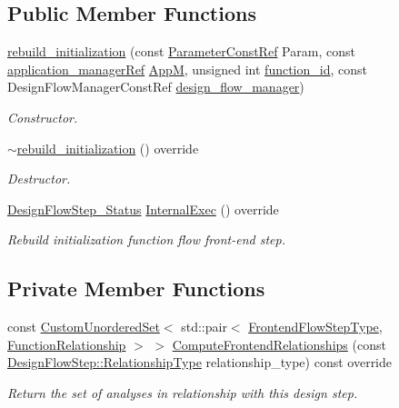 \subsection*{Public Member Functions}
\begin{DoxyCompactItemize}
\item 
\hyperlink{classrebuild__initialization_a3b96231a2b72047550a902503590baec}{rebuild\+\_\+initialization} (const \hyperlink{Parameter_8hpp_a37841774a6fcb479b597fdf8955eb4ea}{Parameter\+Const\+Ref} Param, const \hyperlink{application__manager_8hpp_a04ccad4e5ee401e8934306672082c180}{application\+\_\+manager\+Ref} \hyperlink{classFrontendFlowStep_a0ac0d8db2a378416583f51c4faa59d15}{AppM}, unsigned int \hyperlink{classFunctionFrontendFlowStep_a58ef2383ad1a212a8d3f396625a4b616}{function\+\_\+id}, const Design\+Flow\+Manager\+Const\+Ref \hyperlink{classDesignFlowStep_ab770677ddf087613add30024e16a5554}{design\+\_\+flow\+\_\+manager})
\begin{DoxyCompactList}\small\item\em Constructor. \end{DoxyCompactList}\item 
\hyperlink{classrebuild__initialization_a026135e1c23ed5b77cf93fe574648086}{$\sim$rebuild\+\_\+initialization} () override
\begin{DoxyCompactList}\small\item\em Destructor. \end{DoxyCompactList}\item 
\hyperlink{design__flow__step_8hpp_afb1f0d73069c26076b8d31dbc8ebecdf}{Design\+Flow\+Step\+\_\+\+Status} \hyperlink{classrebuild__initialization_ac95e61c5c62f6c0a5b4ce1557b32ae4f}{Internal\+Exec} () override
\begin{DoxyCompactList}\small\item\em Rebuild initialization function flow front-\/end step. \end{DoxyCompactList}\end{DoxyCompactItemize}
\subsection*{Private Member Functions}
\begin{DoxyCompactItemize}
\item 
const \hyperlink{classCustomUnorderedSet}{Custom\+Unordered\+Set}$<$ std\+::pair$<$ \hyperlink{frontend__flow__step_8hpp_afeb3716c693d2b2e4ed3e6d04c3b63bb}{Frontend\+Flow\+Step\+Type}, \hyperlink{classFrontendFlowStep_af7cf30f2023e5b99e637dc2058289ab0}{Function\+Relationship} $>$ $>$ \hyperlink{classrebuild__initialization_a829e690735887f26f8fb2067fe1abf1f}{Compute\+Frontend\+Relationships} (const \hyperlink{classDesignFlowStep_a723a3baf19ff2ceb77bc13e099d0b1b7}{Design\+Flow\+Step\+::\+Relationship\+Type} relationship\+\_\+type) const override
\begin{DoxyCompactList}\small\item\em Return the set of analyses in relationship with this design step. \end{DoxyCompactList}\end{DoxyCompactItemize}
